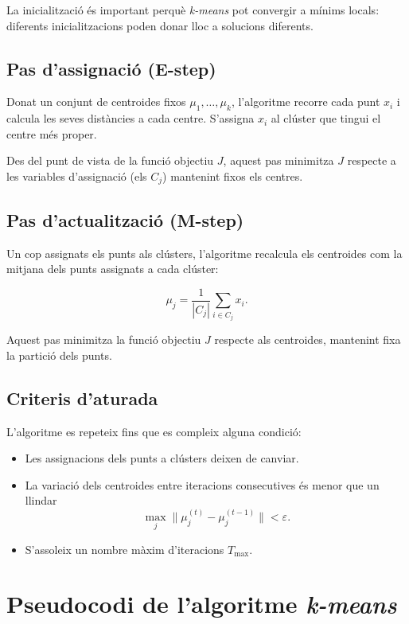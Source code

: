 \documentclass[a4paper,11pt]{article}
\begin{document}
La inicialització és important perquè \textit{k-means} pot convergir
a mínims locals: diferents inicialitzacions poden donar lloc a solucions
diferents.

\subsection{Pas d’assignació (E-step)}

Donat un conjunt de centroides fixos
$\mu_1, \dots, \mu_k$, l’algoritme recorre cada punt $x_i$
i calcula les seves distàncies a cada centre. S’assigna $x_i$ al clúster
que tingui el centre més proper.

Des del punt de vista de la funció objectiu $J$, aquest pas minimitza
$J$ respecte a les variables d’assignació (els $C_j$) mantenint fixos
els centres.

\subsection{Pas d’actualització (M-step)}

Un cop assignats els punts als clústers, l'algoritme recalcula
els centroides com la mitjana dels punts assignats a cada clúster:

\[
  \mu_j = \frac{1}{|C_j|} \sum_{i \in C_j} x_i.
\]

Aquest pas minimitza la funció objectiu $J$ respecte als centroides,
mantenint fixa la partició dels punts.

\subsection{Criteris d’aturada}

L'algoritme es repeteix fins que es compleix alguna condició:

\begin{itemize}
  \item Les assignacions dels punts a clústers deixen de canviar.
  \item La variació dels centroides entre iteracions consecutives
        és menor que un llindar
        \[
          \max_j \|\mu_j^{(t)} - \mu_j^{(t-1)}\| < \varepsilon.
        \]
  \item S'assoleix un nombre màxim d'iteracions $T_{\max}$.
\end{itemize}

\section{Pseudocodi de l'algoritme \textit{k-means}}
\end{document}
